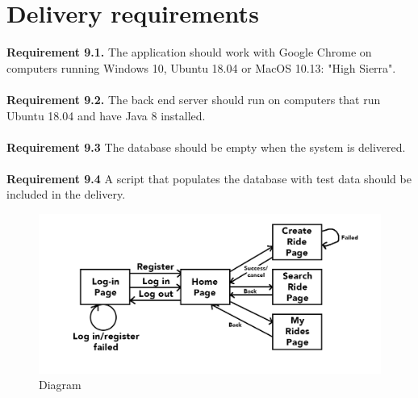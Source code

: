 \documentclass{article}
\begin{document}
\section{Delivery requirements}
\textbf{Requirement 9.1.} The application should work with Google Chrome on computers running Windows 10, Ubuntu 18.04 or MacOS  10.13: "High Sierra".
\\ \\
\textbf{Requirement 9.2.} The back end server should run on computers that run Ubuntu 18.04 and have Java 8 installed.
\\ \\ 
\textbf{Requirement 9.3} The database should be empty when the system is delivered.
\\ \\
\textbf{Requirement 9.4} A script that populates the database with test data should be included in the delivery.

\begin{figure}
  \centering
  \includegraphics[scale=0.25]{diagram.png}
  \caption{Diagram}
  \label{fig:activity}
\end{figure}
\end{document}
